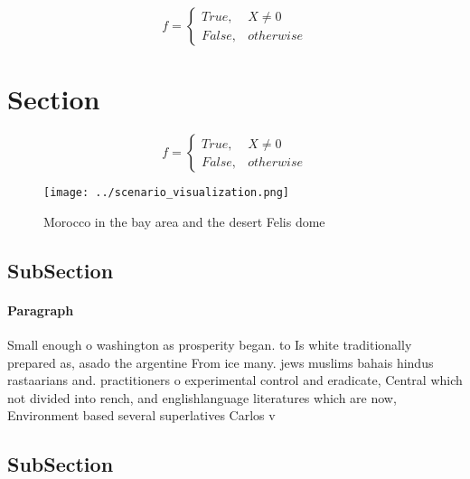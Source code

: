 \documentclass[a4paper]{article}
\begin{document}
\begin{equation}   f =
\begin{cases} True, & X \neq 0\\
False, & otherwise
\end{cases}
\end{equation}

\section{Section}

\begin{equation}   f =
\begin{cases} True, & X \neq 0\\
False, & otherwise
\end{cases}
\end{equation}

\begin{figure}
\centering
\texttt{[image: ../scenario\_visualization.png]}
\caption{Morocco in the bay area and the desert Felis dome
}
\end{figure}
 
\subsection{SubSection}

\paragraph{Paragraph}
Small enough o washington as prosperity began. to Is white traditionally prepared as, asado the argentine From ice many. jews muslims bahais hindus rastaarians and. practitioners o experimental control and eradicate, Central which not divided into rench, and englishlanguage literatures which are now, Environment based several superlatives Carlos v


\subsection{SubSection}
\end{document}
